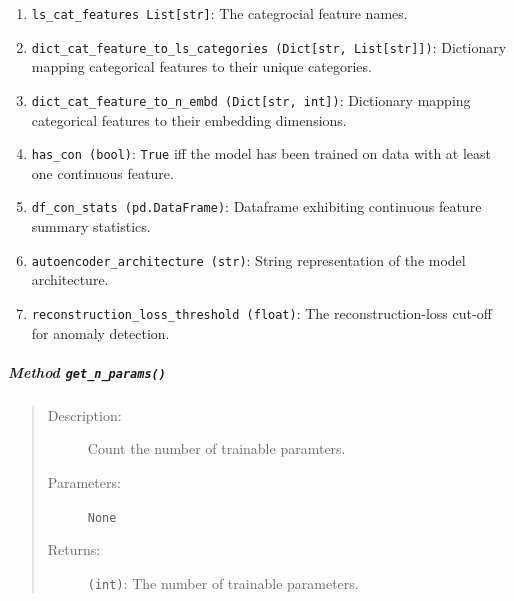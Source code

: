 \documentclass[a4paper, 10pt]{article}
\theoremstyle{plain}
\theoremstyle{definition}
\numberwithin{equation}{section}
\begin{document}
\begin{description}
\begin{enumerate}
            \item \texttt{ls\_cat\_features List[str]}: The categrocial feature names.
            \item \texttt{dict\_cat\_feature\_to\_ls\_categories (Dict[str, List[str]])}: Dictionary mapping categorical features to their unique categories.
            \item \texttt{dict\_cat\_feature\_to\_n\_embd (Dict[str, int])}: Dictionary mapping categorical features to their embedding dimensions.
            \item \texttt{has\_con (bool)}: \texttt{True} iff the model has been trained on data with at least one continuous feature.
            \item \texttt{df\_con\_stats (pd.DataFrame)}: Dataframe exhibiting continuous feature summary statistics.
            \item \texttt{autoencoder\_architecture (str)}: String representation of the model architecture.
            \item \texttt{reconstruction\_loss\_threshold (float)}: The reconstruction-loss cut-off for anomaly detection.
        \end{enumerate}
\end{description}

\subparagraph{Method \texttt{get\_n\_params()}}
\begin{quote}
    \begin{description}
        \item[Description:] Count the number of trainable paramters.
        \item[Parameters:] \texttt{None}
        \item[Returns:] \texttt{(int)}: The number of trainable parameters.
    \end{description}
\end{quote}
\end{document}
